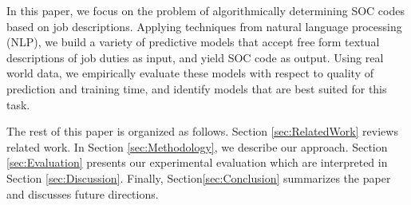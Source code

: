 In this paper, we focus on the problem of algorithmically determining SOC codes based on job descriptions. Applying techniques from natural language processing (NLP), we build a variety of predictive models that accept free form textual descriptions of job duties as input, and yield SOC code as output. Using real world data, we empirically evaluate these models with respect to quality of prediction and training time, and identify models that are best suited for this task.

The rest of this paper is organized as follows. Section \ref{sec:RelatedWork} reviews related work. In Section \ref{sec:Methodology}, we describe our approach. Section \ref{sec:Evaluation} presents our experimental evaluation which are interpreted in Section \ref{sec:Discussion}. Finally, Section\ref{sec:Conclusion} summarizes the paper and discusses future directions.



